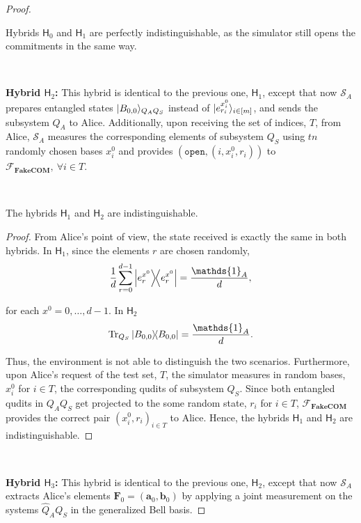 \begin{proof}
\ 

 Hybrids $\mathsf{H}_0$ and $ \mathsf{H}_1$ are perfectly indistinguishable, as the simulator still opens the commitments in the same way.

\

\textbf{Hybrid $\mathsf{H}_2$:} This hybrid is identical to the previous one, $ \mathsf{H}_1$, except that now $\mathcal{S}_A$ prepares entangled states $| B_{0,0} \rangle_{Q_A Q_S}$ instead of $| e^{x^0_i}_{r_i} \rangle_{ i\in [m]}$, and sends the subsystem $Q_A$ to Alice. Additionally, upon receiving  the set of indices, $T$, from Alice, $\mathcal{S}_A$  measures the corresponding elements of subsystem $Q_S$ using $tn$ randomly chosen bases $x^0_i$ and provides $(\texttt{open}, (i, x^0_i, r_i))$ to  $\mathcal{F}_{\textbf{FakeCOM}},\ \forall i\in T$.


\

\begin{claim}
The hybrids $\mathsf{H}_1$ and $\mathsf{H}_2$ are indistinguishable.
\label{claim:h1h2Alice}
\end{claim}
\begin{proof}
From Alice's point of view, the state received  is exactly the same in both hybrids. In $\mathsf{H}_1$, since the elements $r$  are chosen randomly,
\begin{equation*}
    \frac{1}{d}\sum_{r=0}^{d-1} \ketbra{e^{x^0}_{r}} = \frac{\mathds{1}_A}{d},
\end{equation*}

for each $x^0 = 0, \ldots, d-1$. In $\mathsf{H}_2$
\begin{equation*}
    \Tr_{Q_S}{\ketbra{B_{0,0}}} = \frac{\mathds{1}_A}{d}.
\end{equation*}

Thus, the environment is not able to distinguish the two scenarios. Furthermore, upon Alice's request of the test set, $T$, the simulator  measures in random bases, $x^0_i$  for $i\in T$, the corresponding qudits of subsystem $Q_S$. Since both entangled qudits in $Q_A Q_S$ get projected to the some random state, $r_i$  for $i\in T$,  $\mathcal{F}_{\textbf{FakeCOM}}$  provides the correct pair $(x^0_i, r_i)_{ i\in T}$ to Alice. Hence, the hybrids $\mathsf{H}_1$ and $\mathsf{H}_2$ are indistinguishable.
\end{proof}

\

\textbf{Hybrid $\mathsf{H}_3$:} This hybrid is identical to the previous one, $\mathsf{H}_2$, except that now $\mathcal{S}_A$ extracts Alice's elements $\mathbf{F}_0 = (\bm{a}_0, \bm{b}_0)$  by applying a joint measurement on the systems $\hat{Q}_A Q_S$ in the generalized Bell basis.


\end{proof}

